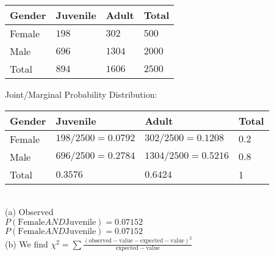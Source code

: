 \documentclass[boxes, qed]{homework}
\begin{document}
\begin{problem}
  \begin{tabular}{l|l|l|l}
    \hline
    Gender & Juvenile & Adult & Total \\
    \hline
    Female & $198$ & $302$ & $500$ \\
    Male & $696$ & $1304$ & $2000$ \\
    \hline
    Total & $894$ & $1606$ & $2500$ \\
  \end{tabular}
\end{problem}
\begin{solution}
  Joint/Marginal Probability Distribution:\\

  \begin{tabular}{l|l|l|l}
    \hline
    Gender & Juvenile & Adult & Total \\
    \hline
    Female & $198/2500=0.0792$ & $302/2500=0.1208$ & $0.2$ \\
    Male & $696/2500=0.2784$ & $1304/2500=0.5216$ & $0.8$ \\
    \hline
    Total & $0.3576$ & $0.6424$ & 1 \\
  \end{tabular}\\

  (a) Observed\\

  $P(\mathrm{Female} AND \mathrm{Juvenile})=0.07152$\\
  $P(\mathrm{Female} AND \mathrm{Juvenile})=0.07152$\\

  (b) We find $\chi^2=\sum{\frac{(\mathrm{observed-value}-\mathrm{expected-value})^2}{\mathrm{expected-value}}}$ 
\end{solution}
\end{document}
